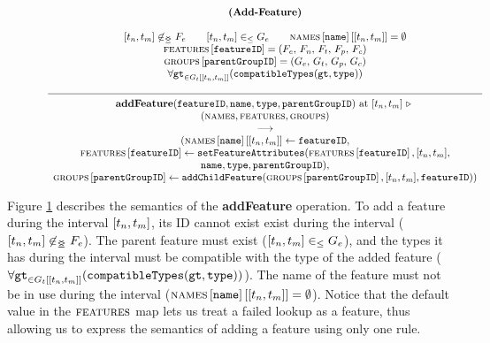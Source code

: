 \begin{figure}[h]
    \renewcommand{\arraystretch}{1.1}
    \sossize$$\begin{array}{c}
      \ntyperule{Add-Feature}
      {\\
        \interval{t_n}{t_m} \not \innr F_e \qquad
        \interval{t_n}{t_m} \inn G_e \qquad
        \lookup{\lookup{\names{}}{\var{name}}}{\interval{t_n}{t_m}} = \emptyset \\
        \lookup{\features{}}{\var{featureID}} = \feature \\
        \lookup{\groups{}}{\var{parentGroupID}} = \group\\
        \forall \var{gt}_{\in \lookup{G_t}{\interval{t_n}{t_m}}} (\var{compatibleTypes}(\var{gt}, \var{type})) \\
      }
      {
        \textbf{addFeature}(\var{featureID}, \var{name}, \var{type}, \var{parentGroupID})\text{ at }\interval{t_n}{t_m} \shove \\
         (\names{}, \features{}, \groups{})\\
        \transition\\
        (\lookup{\lookup{\names{}}{\var{name}}}{\interval{t_n}{t_m}} \assign \var{featureID},  \\
        {\lookup{\features{}}{\var{featureID}}} \assign 
        \var{setFeatureAttributes}(\lookup{\features{}}{\var{featureID}}, 
        \interval{t_n}{t_m}, \\
        \var{name}, \var{type}, \var{parentGroupID}),\\
        {\lookup{\groups{}}{\var{parentGroupID}}} \assign 
        \var{addChildFeature}(\lookup{\groups{}}{\var{parentGroupID}}, \interval{t_n}{t_m}, \var{featureID}))
    }
    \end{array}$$
    \caption{\label{rule:add-feature}}
\end{figure}

Figure \ref{rule:add-feature}  describes the semantics of the \textbf{addFeature} operation. 
To add a feature during the interval $\interval{t_n}{t_m}$, its ID cannot exist exist during the interval ($\interval{t_n}{t_m} \not \innr F_e$). The parent feature must exist ($\interval{t_n}{t_m} \inn G_e$), and the types it has during the interval must be compatible with the type of the 
added feature ($\forall \var{gt}_{\in \lookup{G_t}{\interval{t_n}{t_m}}} (\var{compatibleTypes}(\var{gt}, \var{type}))$). The name of the feature must not be in use during the interval ($\lookup{\lookup{\names{}}{\var{name}}}{\interval{t_n}{t_m}} = \emptyset$). Notice that the default value in the $\textsc{features}{}$ map lets us treat a failed lookup as a feature, thus allowing us to express the semantics of adding a feature using only one rule. 


